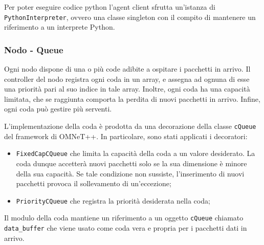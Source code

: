 \documentclass[conference]{IEEEtran}
\newcommand{\code}[1]{\texttt{#1}}
\begin{document}
Per poter eseguire codice python l'agent client sfrutta un'istanza di
\code{PythonInterpreter}, ovvero una classe singleton con il compito di mantenere un 
riferimento a un interprete Python.
 
\subsubsection{Nodo - Queue}
Ogni nodo dispone di una o più code adibite a ospitare i pacchetti in arrivo.
Il controller del nodo registra ogni coda in un array, e assegna ad ognuna di esse una
priorità pari al suo indice in tale array. Inoltre, ogni coda ha una capacità limitata,
che se raggiunta comporta la perdita di nuovi pacchetti in arrivo. Infine, ogni coda
può gestire più serventi.

L'implementazione della coda è prodotta da una decorazione della classe \code{cQueue}
del framework di OMNeT++. In particolare, sono stati applicati i decoratori:
\begin{itemize}
    \item \code{FixedCapCQueue} che limita la capacità della coda a un valore desiderato.
    La coda dunque accetterà nuovi pacchetti solo se la sua dimensione è minore della
    sua capacità. Se tale condizione non sussiste, l'inserimento di nuovi pacchetti
    provoca il sollevamento di un'eccezione;
    \item \code{PriorityCQueue} che registra la priorità desiderata nella coda;
\end{itemize}
Il modulo della coda mantiene un riferimento a un oggetto \code{cQueue} chiamato
\code{data\_buffer} che viene usato
come coda vera e propria per i pacchetti dati in arrivo.
\end{document}
